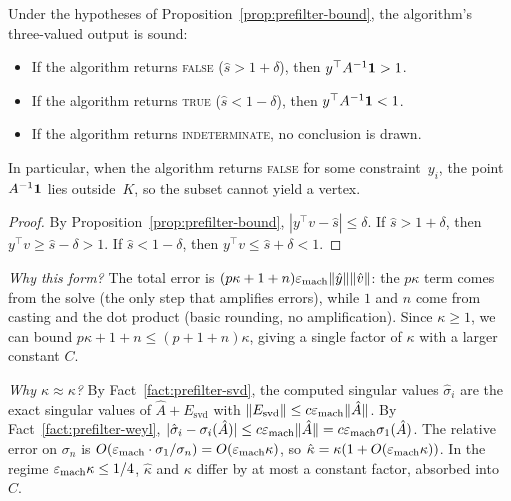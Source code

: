 \begin{corollary}\label{cor:prefilter-soundness}
Under the hypotheses of Proposition~\ref{prop:prefilter-bound},
the algorithm's three-valued output is sound:
\begin{itemize}
\item If the algorithm returns \textsc{false}
  ($\hat{s} > 1 + \delta$), then $y^\top A^{-1}\mathbf{1} > 1$.
\item If the algorithm returns \textsc{true}
  ($\hat{s} < 1 - \delta$), then $y^\top A^{-1}\mathbf{1} < 1$.
\item If the algorithm returns \textsc{indeterminate},
  no conclusion is drawn.
\end{itemize}
In particular, when the algorithm returns \textsc{false}
for some constraint~$y_i$, the point $A^{-1}\mathbf{1}$ lies
outside~$K$, so the subset cannot yield a vertex.
\end{corollary}

\begin{proof}
By Proposition~\ref{prop:prefilter-bound},
$|y^\top v - \hat{s}| \le \delta$.
If $\hat{s} > 1 + \delta$, then
$y^\top v \ge \hat{s} - \delta > 1$.
If $\hat{s} < 1 - \delta$, then
$y^\top v \le \hat{s} + \delta < 1$.
\end{proof}

\noindent
\textit{Why this form?}
The total error is $(p\kappa + 1 + n)\varepsilon_{\mathrm{mach}}\|\hat{y}\|\|\hat{v}\|$:
the $p\kappa$ term comes from the solve (the only step that
amplifies errors), while $1$ and $n$ come from casting and
the dot product (basic rounding, no amplification).
Since $\kappa \ge 1$, we can bound
$p\kappa + 1 + n \le (p + 1 + n)\kappa$,
giving a single factor of $\kappa$ with a larger constant $C$.

\medskip
\noindent
\textit{Why $\hat\kappa \approx \kappa$?}
By Fact~\ref{fact:prefilter-svd}, the computed singular values
$\hat\sigma_i$ are the exact singular values of
$\hat{A} + E_{\mathrm{svd}}$ with
$\|E_{\mathrm{svd}}\| \le c\varepsilon_{\mathrm{mach}}\|\hat{A}\|$.
By Fact~\ref{fact:prefilter-weyl},
$|\hat\sigma_i - \sigma_i(\hat{A})| \le c\varepsilon_{\mathrm{mach}}\|\hat{A}\|
= c\varepsilon_{\mathrm{mach}}\sigma_1(\hat{A})$.
The relative error on $\sigma_n$ is
$O(\varepsilon_{\mathrm{mach}} \cdot \sigma_1/\sigma_n) = O(\varepsilon_{\mathrm{mach}}\kappa)$,
so $\hat\kappa = \kappa(1 + O(\varepsilon_{\mathrm{mach}}\kappa))$.
In the regime $\varepsilon_{\mathrm{mach}}\kappa \le 1/4$,
$\hat\kappa$ and $\kappa$ differ by at most a constant
factor, absorbed into $C$.

